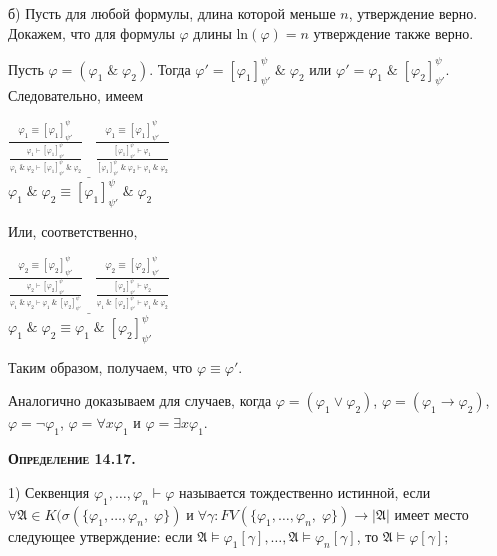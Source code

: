 \documentclass[18pt, a4paper]{extarticle}
\newcommand{\ampersand}{\;\&\;}
\newcommand{\vd}{\vdash}
\begin{document}
б) Пусть для любой формулы, длина которой меньше $n$, утверждение верно. Докажем, что для формулы $\varphi$ длины $\text{ln}(\varphi) = n$ утверждение также верно.

Пусть $\varphi = (\varphi_1 \ampersand \varphi_2)$. Тогда $\varphi' = [\varphi_1]^\psi_{\psi'}\ampersand\varphi_2$ или $\varphi' = \varphi_1\ampersand [\varphi_2]^\psi_{\psi'}$. Следовательно, имеем
\begin{center}
    $\displaystyle\underline{\frac{\varphi_1\equiv [\varphi_1]^\psi_{\psi'}}{\displaystyle\frac{\varphi_1\vd [\varphi_1]^\psi_{\psi'}}{\varphi_1\ampersand \varphi_2 \vd [\varphi_1]^\psi_{\psi'}\ampersand \varphi_2}}\;\;\;
    \frac{\varphi_1\equiv [\varphi_1]^\psi_{\psi'}}{\displaystyle\frac{[\varphi_1]^\psi_{\psi'} \vd \varphi_1}{[\varphi_1]^\psi_{\psi'}\ampersand \varphi_2 \vd \varphi_1\ampersand \varphi_2}}}$\\
    $\varphi_1 \ampersand \varphi_2 \equiv [\varphi_1]^\psi_{\psi'}\ampersand\varphi_2$
\end{center}

Или, соответственно,
\begin{center}
    $\displaystyle\underline{\frac{\varphi_2\equiv [\varphi_2]^\psi_{\psi'}}{\displaystyle\frac{\varphi_2\vd [\varphi_2]^\psi_{\psi'}}{\varphi_1\ampersand \varphi_2 \vd \varphi_1\ampersand [\varphi_2]^\psi_{\psi'}}}\;\;\;
    \frac{\varphi_2\equiv [\varphi_2]^\psi_{\psi'}}{\displaystyle\frac{[\varphi_2]^\psi_{\psi'} \vd \varphi_2}{\varphi_1\ampersand[\varphi_2]^\psi_{\psi'} \vd \varphi_1\ampersand \varphi_2}}}$\\
    $\varphi_1 \ampersand \varphi_2 \equiv \varphi_1\ampersand [\varphi_2]^\psi_{\psi'}$
\end{center}

Таким образом, получаем, что $\varphi\equiv\varphi'$.

Аналогично доказываем для случаев, когда $\varphi = (\varphi_1\vee\varphi_2)$, $\varphi = (\varphi_1\to\varphi_2)$, $\varphi = \lnot\varphi_1$, $\varphi = \forall x\varphi_1$ и $\varphi = \exists x\varphi_1$.\\

\newpage

\textbf{\textsc{Определение 14.17.}} 

1) Секвенция $\varphi_1,\dots,\varphi_n\vdash\varphi$  называется тождественно истинной, если \newline$\forall\mathfrak{A}\in K(\sigma(\{\varphi_1,\dots,\varphi_n,\;\varphi\})\;\text{и}\;\forall\gamma:FV(\{\varphi_1,\dots,\varphi_n,\;\varphi\})\to|\mathfrak{A}|$ имеет место следующее утверждение: если $\mathfrak{A}\vDash\varphi_1[\gamma],\dots,\mathfrak{A}\vDash\varphi_n[\gamma]$, то $\mathfrak{A}\vDash\varphi[\gamma];$
\end{document}
